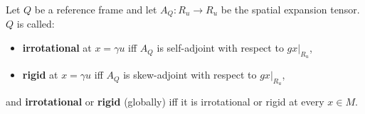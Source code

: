 Let $Q$ be a reference frame and let $A_Q: R_u \rightarrow R_u$ be the spatial expansion tensor. $Q$ is called:
\begin{itemize}
  \item \textbf{irrotational} at $x = \gamma u$ iff $A_Q$ is self-adjoint with respect to $gx|_{R_u}$,
  \item \textbf{rigid} at $x = \gamma u$ iff $A_Q$ is skew-adjoint with respect to $gx|_{R_u}$,
\end{itemize}
and \textbf{irrotational} or \textbf{rigid} (globally) iff it is irrotational or rigid at every $x \in M$.
